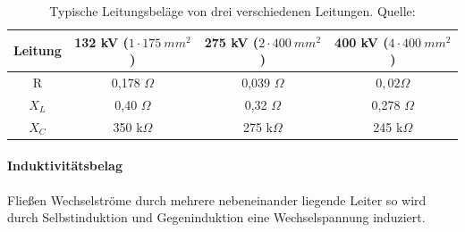 \setlength{\tabcolsep}{10pt}
\renewcommand{\arraystretch}{1.5}
\begin{table}[tbhn]
\begin{center}
\noindent
\begin{tabular}{|c|ccc|}
\hline 
Leitung & 132 kV ($1\cdot 175\ mm^2$) & 275 kV ($2\cdot 400\ mm^2$) & 400 kV ($4\cdot 400\ mm^2$) \\ 
\hline 
R & 0,178 $\Omega$ & 0,039 $\Omega$ & $0,02 \Omega$ \\ 

$X_L$ & 0,40 $\Omega$ & 0,32 $\Omega$ & 0,278 $\Omega$ \\ 

$X_C$ & 350 k$\Omega$ & 275 k$\Omega$ & 245 k$\Omega$ \\ 
\hline 
\end{tabular} 
\end{center}
\caption{Typische Leitungsbeläge von drei verschiedenen Leitungen. Quelle: \cite{Harrison}} %
\label{tab:freileitung}
\end{table}

\paragraph{Induktivitätsbelag}

Fließen Wechselströme durch mehrere nebeneinander liegende Leiter so wird durch Selbstinduktion und Gegeninduktion eine Wechselspannung induziert.

